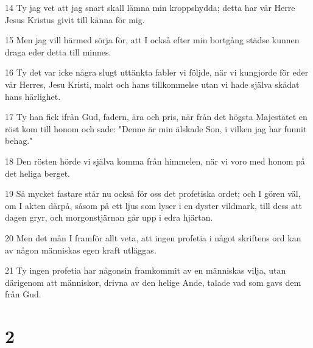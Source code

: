 \par 14 Ty jag vet att jag snart skall lämna min kroppshydda; detta har vår Herre Jesus Kristus givit till känna för mig.
\par 15 Men jag vill härmed sörja för, att I också efter min bortgång städse kunnen draga eder detta till minnes.
\par 16 Ty det var icke några slugt uttänkta fabler vi följde, när vi kungjorde för eder vår Herres, Jesu Kristi, makt och hans tillkommelse utan vi hade själva skådat hans härlighet.
\par 17 Ty han fick ifrån Gud, fadern, ära och pris, när från det högsta Majestätet en röst kom till honom och sade: "Denne är min älskade Son, i vilken jag har funnit behag."
\par 18 Den rösten hörde vi själva komma från himmelen, när vi voro med honom på det heliga berget.
\par 19 Så mycket fastare står nu också för oss det profetiska ordet; och I gören väl, om I akten därpå, såsom på ett ljus som lyser i en dyster vildmark, till dess att dagen gryr, och morgonstjärnan går upp i edra hjärtan.
\par 20 Men det mån I framför allt veta, att ingen profetia i något skriftens ord kan av någon människas egen kraft utläggas.
\par 21 Ty ingen profetia har någonsin framkommit av en människas vilja, utan därigenom att människor, drivna av den helige Ande, talade vad som gavs dem från Gud.

\chapter{2}

